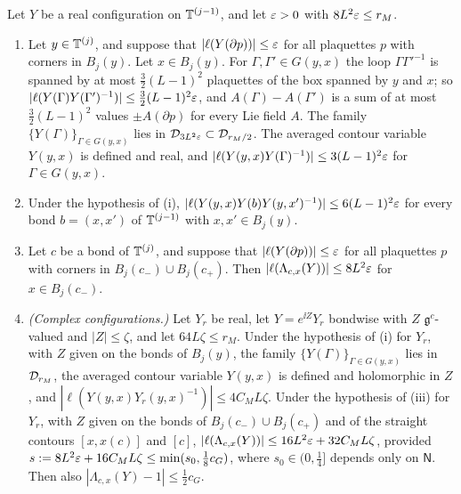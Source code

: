 \begin{lemma}\label{lem:stokes-avg}
Let $Y$ be a real configuration on $\mathbb T^{(j-1)}$, and let $\varepsilon>0$ with $8L^2\varepsilon\le r_M$.
\begin{enumerate}[label=(\roman*)]
\item Let $y\in\mathbb T^{(j)}$, and suppose that $|\ell(Y(\partial p))|\le\varepsilon$ for all plaquettes $p$ with corners in $B_j(y)$. Let $x\in B_j(y)$. For $\Gamma,\Gamma'\in G(y,x)$ the loop $\Gamma\Gamma'^{-1}$ is spanned by at most $\frac32(L-1)^2$ plaquettes of the box spanned by $y$ and $x$; so $|\ell(Y(\Gamma)Y(\Gamma')^{-1})|\le\frac32(L-1)^2\varepsilon$, and $A(\Gamma)-A(\Gamma')$ is a sum of at most $\frac32(L-1)^2$ values $\pm A(\partial p)$ for every Lie field $A$. The family $\{Y(\Gamma)\}_{\Gamma\in G(y,x)}$ lies in $\mathcal D_{3L^2\varepsilon}\subset\mathcal D_{r_M/2}$. The averaged contour variable $Y(y,x)$ is defined and real, and $|\ell(Y(y,x)Y(\Gamma)^{-1})|\le3(L-1)^2\varepsilon$ for $\Gamma\in G(y,x)$.
\item Under the hypothesis of (i), $|\ell(Y(y,x)Y(b)Y(y,x')^{-1})|\le6(L-1)^2\varepsilon$ for every bond $b=(x,x')$ of $\mathbb T^{(j-1)}$ with $x,x'\in B_j(y)$.
\item Let $c$ be a bond of $\mathbb T^{(j)}$, and suppose that $|\ell(Y(\partial p))|\le\varepsilon$ for all plaquettes $p$ with corners in $B_j(c_-)\cup B_j(c_+)$. Then $|\ell(\Lambda_{c,x}(Y))|\le8L^2\varepsilon$ for $x\in B_j(c_-)$.
\item \emph{(Complex configurations.)} Let $Y_r$ be real, let $Y=e^{\ii Z}Y_r$ bondwise with $Z$ $\mathfrak g^c$-valued and $|Z|\le\zeta$, and let $64L\zeta\le r_M$. Under the hypothesis of (i) for $Y_r$, with $Z$ given on the bonds of $B_j(y)$, the family $\{Y(\Gamma)\}_{\Gamma\in G(y,x)}$ lies in $\mathcal D_{r_M}$, the averaged contour variable $Y(y,x)$ is defined and holomorphic in $Z$, and $|\ell(Y(y,x)Y_r(y,x)^{-1})|\le4C_ML\zeta$. Under the hypothesis of (iii) for $Y_r$, with $Z$ given on the bonds of $B_j(c_-)\cup B_j(c_+)$ and of the straight contours $[x,x(c)]$ and $[c]$, $|\ell(\Lambda_{c,x}(Y))|\le16L^2\varepsilon+32C_ML\zeta$, provided $s:=8L^2\varepsilon+16C_ML\zeta\le\min(s_0,\frac18c_G)$, where $s_0\in(0,\frac14]$ depends only on $\mathsf N$. Then also $|\Lambda_{c,x}(Y)-1|\le\frac12c_G$.
\end{enumerate}
\end{lemma}


